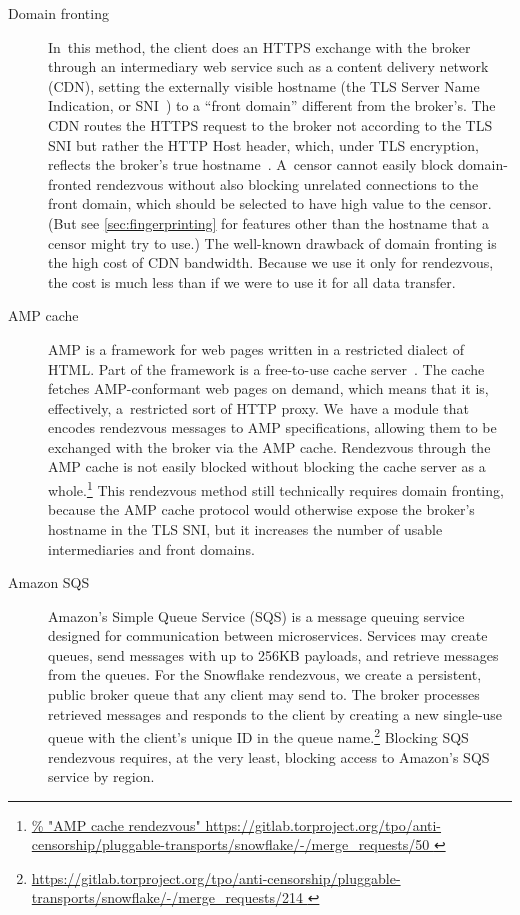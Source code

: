 \documentclass[letterpaper,twocolumn]{article}
\newlength{\urlfootnotesize}
\newcommand{\urlfootnote}[1]{\footnote{
\raggedright\fontsize{\urlfootnotesize}{\urlfootnotesize}\selectfont\url{#1}
}}
\begin{document}
\begin{description}
\item[Domain fronting]
In~this method, the client does an HTTPS exchange with the broker
through an intermediary web service such as a content delivery network (CDN),
setting the externally visible hostname
(the TLS Server Name Indication, or SNI~\cite[\S 3]{rfc6066})
to a ``front domain'' different from the broker's.
The CDN routes the HTTPS request to the broker not according to the TLS SNI
but rather the HTTP Host header, which, under TLS encryption,
reflects the broker's true hostname~\cite{Fifield2015a}.
A~censor cannot easily block domain-fronted rendezvous
without also blocking unrelated connections to the front domain,
which should be selected to have high value to the censor.
(But see \autoref{sec:fingerprinting} for features other than
the hostname that a censor might try to use.)
The well-known drawback of domain fronting
is the high cost of CDN bandwidth.
Because we use it only for rendezvous,
the cost is much less than if we were to use it
for all data transfer.

\item[AMP cache]
AMP is a framework for web pages written in a restricted dialect of HTML.
Part of the framework is a free-to-use
cache server~\cite{amp-cache}.
The cache fetches AMP-conformant web pages on demand,
which means that it is, effectively, a~restricted sort of HTTP proxy.
We~have a module that encodes rendezvous messages to AMP specifications,
allowing them to be exchanged with the broker via the AMP cache.
Rendezvous through the AMP cache is not easily blocked
without blocking the cache server as a whole.\urlfootnote{
https://gitlab.torproject.org/tpo/anti-censorship/pluggable-transports/snowflake/-/merge_requests/50
}
This rendezvous method still technically requires domain fronting,
because the AMP cache protocol would otherwise expose the
broker's hostname in the TLS SNI,
but it increases the number of usable intermediaries and front domains.

\item[Amazon SQS]
Amazon's Simple Queue Service (SQS) is a message queuing service designed for
communication between microservices. Services may create queues, send messages
with up to 256KB payloads, and retrieve messages from the queues. For the Snowflake
rendezvous, we create a persistent, public broker queue that any client may send to.
The broker processes retrieved messages and responds to the client by creating a new
single-use queue with the client's unique ID in the queue name.\urlfootnote{
https://gitlab.torproject.org/tpo/anti-censorship/pluggable-transports/snowflake/-/merge_requests/214
}
Blocking SQS rendezvous requires, at the very least, blocking access to Amazon's SQS service by region.
\end{description}
\end{document}
